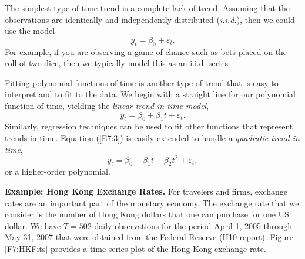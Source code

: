 The simplest type of time trend is a complete lack of trend.
Assuming that the observations are identically and independently
distributed (\emph{i.i.d.}), then we could use the model
\begin{equation*}
y_t = \beta_0 + \varepsilon_t.
\end{equation*}
For example, if you are observing a game of chance such as bets
placed on the roll of two dice, then we typically model this as an
i.i.d. series.


Fitting polynomial functions of time is another type of trend that
is easy to interpret and to fit to the data. We begin with a
straight line for our polynomial function of time, yielding the
\emph{linear trend in time model},
\begin{equation}\label{E7:3}
y_t = \beta_0 + \beta_1 t + \varepsilon_t.
\end{equation}
Similarly, regression techniques can be used to fit other functions
that represent trends in time. Equation (\ref{E7:3}) is easily
extended to handle a \emph{quadratic trend in time},
\begin{equation*}
y_t = \beta_0 + \beta_1 t + \beta_2 t^2 + \varepsilon_t,
\end{equation*}
or a higher-order polynomial.

\linejed


\textbf{Example: Hong Kong Exchange Rates.} For travelers and firms, exchange rates are an
important part of the monetary economy. The exchange rate that we
consider is the number of Hong Kong dollars that one can purchase
for one US dollar. We have $T=502$ daily observations for the period
April 1, 2005 through May 31, 2007 that were obtained from the
Federal Reserve (H10 report). Figure \ref{F7:HKFits} provides a time
series plot of the Hong Kong exchange rate.

